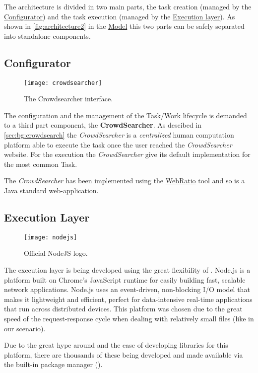 

The architecture is divided in two main parts, the task creation (managed by
the \hyperref[sec:configurator]{Configurator}) and the task execution (managed by
the \hyperref[sec:exec-layer]{Execution layer}).
As shown in \autoref{fig:architecture2} in the \hyperref[cap:model]{Model}
this two parts can be safely separated into standalone components.

\subsection{Configurator}
\begin{figure}[htb]
    \centering
    \texttt{[image: crowdsearcher]}
    \caption{The Crowdsearcher interface.}
    \label{fig:crowdsearcher}
\end{figure}
The configuration and the management of the Task/Work lifecycle is demanded to a
third part component, the \textbf{CrowdSearcher}. As descibed in
\ref{sec:bg:crowdsearch} the \emph{CrowdSearcher} is a \emph{centralized} human
computation platform able to execute the task once the user reached the
\emph{CrowdSearcher} website. For the execution the \emph{CrowdSearcher} give its
default implementation for the most common Task.

The \emph{CrowdSearcher} has been implemented using the
\href{http://www.webratio.com}{WebRatio} tool and so is a Java standard
web-application.


\subsection{Execution Layer}
\begin{figure}[htb]
    \centering
    \texttt{[image: nodejs]}
    \caption{Official NodeJS logo.}
    \label{fig:node-logo}
\end{figure}
The execution layer is being developed using the great flexibility of .
Node.js is a platform built on Chrome's JavaScript runtime for easily building fast,
scalable network applications. Node.js uses an event-driven, non-blocking I/O model
that makes it lightweight and efficient, perfect for data-intensive real-time
applications that run across distributed devices.
This platform was chosen due to the great speed of the request-response cycle
when dealing with relatively small files (like in our scenario).

Due to the great hype around  and the ease of developing
libraries for this platform, there are thousands of these being developed and
made available via the built-in package manager ().\\


